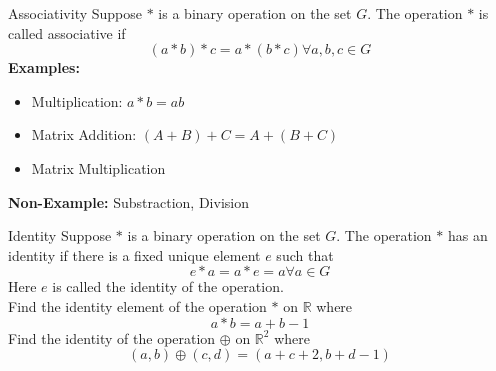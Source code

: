 \documentclass[11pt]{beamer}
\theoremstyle{plain}
\begin{document}
\begin{frame}{Associativity}
    Suppose $*$ is a binary operation on the set $G$. The operation $*$ is called associative if $$(a*b)*c=a*(b*c) \forall a,b,c\in G$$
    \textbf{Examples:}
    \begin{itemize}
    \item Multiplication: $a*b=ab$
    \item Matrix Addition: $(A+B)+C=A+(B+C)$
    \item Matrix Multiplication
    \end{itemize}
    \textbf{Non-Example:}
    Substraction, Division
\end{frame}

\begin{frame}{Identity}
    Suppose $*$ is a binary operation on the set $G$. The operation $*$ has an identity if there is a fixed unique element $e$ such that 
    $$e*a=a*e=a\forall a\in G$$
    Here $e$ is called the identity of the operation.\\
    Find the identity element of the operation $*$ on $\mathbb R$ where $$a*b=a+b-1$$
    Find the identity of the operation $\oplus$ on $\mathbb R^2$ where
    $$(a,b)\oplus(c,d)=(a+c+2,b+d-1)$$
\end{frame}
\end{document}
